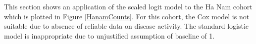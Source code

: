 This section shows an application of the scaled logit model to the Ha Nam cohort which is plotted in Figure \ref{HanamCounts}. For this cohort, the Cox model is not suitable due to absence of reliable data on disease activity. The standard logistic model is inappropriate due to unjustified assumption of baseline of 1.
